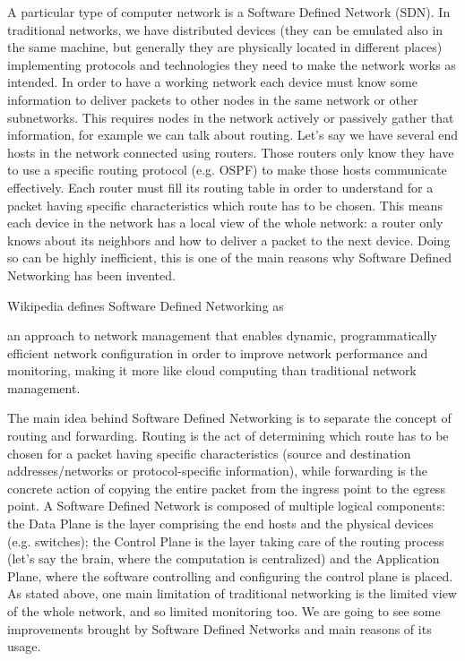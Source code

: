 \documentclass[a4paper,10pt]{memoir}
\begin{document}
A particular type of computer network is a Software Defined Network (SDN). In traditional networks, we have distributed devices (they can be emulated also in the same machine, but generally they are physically located in different places) implementing protocols and technologies they need to make the network works as intended. In order to have a working network each device must know some information to deliver packets to other nodes in the same network or other subnetworks. This requires nodes in the network actively or passively gather that information, for example we can talk about routing. Let's say we have several end hosts in the network connected using routers. Those routers only know they have to use a specific routing protocol (e.g. OSPF) to make those hosts communicate effectively. Each router must fill its routing table in order to understand for a packet having specific characteristics which route has to be chosen. This means each device in the network has a local view of the whole network: a router only knows about its neighbors and how to deliver a packet to the next device. Doing so can be highly inefficient, this is one of the main reasons why Software Defined Networking has been invented.
 
Wikipedia defines Software Defined Networking \cite{sdn-wikipedia} as 
\begin{quoting}[font=itshape, begintext={"}, endtext={"}]an approach to network management that enables dynamic, programmatically efficient network configuration in order to improve network performance and monitoring, making it more like cloud computing than traditional network management.
\end{quoting}

The main idea behind Software Defined Networking is to separate the concept of routing and forwarding. Routing is the act of determining which route has to be chosen for a packet having specific characteristics (source and destination addresses/networks or protocol-specific information), while forwarding is the concrete action of copying the entire packet from the ingress point to the egress point. A Software Defined Network is composed of multiple logical components: the Data Plane is the layer comprising the end hosts and the physical devices (e.g. switches); the Control Plane is the layer taking care of the routing process (let's say the brain, where the computation is centralized) and the Application Plane, where the software controlling and configuring the control plane is placed. As stated above, one main limitation of traditional networking is the limited view of the whole network, and so limited monitoring too. We are going to see some improvements brought by Software Defined Networks and main reasons of its usage.
\end{document}
